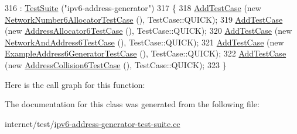 \begin{DoxyCode}
316     : \hyperlink{classns3_1_1TestSuite_a904b0c40583b744d30908aeb94636d1a}{TestSuite} (\textcolor{stringliteral}{"ipv6-address-generator"})
317   \{
318     \hyperlink{classns3_1_1TestCase_a3718088e3eefd5d6454569d2e0ddd835}{AddTestCase} (\textcolor{keyword}{new} \hyperlink{classNetworkNumber6AllocatorTestCase}{NetworkNumber6AllocatorTestCase} (), 
      TestCase::QUICK);
319     \hyperlink{classns3_1_1TestCase_a3718088e3eefd5d6454569d2e0ddd835}{AddTestCase} (\textcolor{keyword}{new} \hyperlink{classAddressAllocator6TestCase}{AddressAllocator6TestCase} (), TestCase::QUICK);
320     \hyperlink{classns3_1_1TestCase_a3718088e3eefd5d6454569d2e0ddd835}{AddTestCase} (\textcolor{keyword}{new} \hyperlink{classNetworkAndAddress6TestCase}{NetworkAndAddress6TestCase} (), TestCase::QUICK);
321     \hyperlink{classns3_1_1TestCase_a3718088e3eefd5d6454569d2e0ddd835}{AddTestCase} (\textcolor{keyword}{new} \hyperlink{classExampleAddress6GeneratorTestCase}{ExampleAddress6GeneratorTestCase} (), 
      TestCase::QUICK);
322     \hyperlink{classns3_1_1TestCase_a3718088e3eefd5d6454569d2e0ddd835}{AddTestCase} (\textcolor{keyword}{new} \hyperlink{classAddressCollision6TestCase}{AddressCollision6TestCase} (), TestCase::QUICK);
323   \}
\end{DoxyCode}


Here is the call graph for this function\+:




The documentation for this class was generated from the following file\+:\begin{DoxyCompactItemize}
\item 
internet/test/\hyperlink{ipv6-address-generator-test-suite_8cc}{ipv6-\/address-\/generator-\/test-\/suite.\+cc}\end{DoxyCompactItemize}
